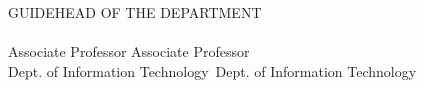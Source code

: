 \begin{titlepage}
\noindent GUIDE\hfill HEAD OF THE DEPARTMENT\\
\cGuide \hfill \cHod \\
Associate Professor \hfill Associate Professor\\
Dept. of Information Technology\ \hfill Dept. of Information Technology\\

\end{titlepage}


